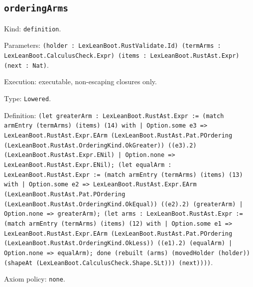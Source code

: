 \documentclass[11pt]{article}
\begin{document}
\subsection*{\texttt{orderingArms}}
\noindent Kind: \texttt{definition}.\par
\noindent Parameters: \texttt{(holder : LexLeanBoot.RustValidate.Id) (termArms : LexLeanBoot.CalculusCheck.Expr) (items : LexLeanBoot.RustAst.Expr) (next : Nat)}.\par
\noindent Execution: executable, non-escaping closures only.\par
\noindent Type: \texttt{Lowered}.\par
\noindent Definition: \texttt{(let greaterArm : LexLeanBoot.RustAst.Expr := (match armEntry (termArms) (items) (14) with | Option.some e3 => LexLeanBoot.RustAst.Expr.EArm (LexLeanBoot.RustAst.Pat.POrdering (LexLeanBoot.RustAst.OrderingKind.OkGreater)) ((e3).2) (LexLeanBoot.RustAst.Expr.ENil) | Option.none => LexLeanBoot.RustAst.Expr.ENil); (let equalArm : LexLeanBoot.RustAst.Expr := (match armEntry (termArms) (items) (13) with | Option.some e2 => LexLeanBoot.RustAst.Expr.EArm (LexLeanBoot.RustAst.Pat.POrdering (LexLeanBoot.RustAst.OrderingKind.OkEqual)) ((e2).2) (greaterArm) | Option.none => greaterArm); (let arms : LexLeanBoot.RustAst.Expr := (match armEntry (termArms) (items) (12) with | Option.some e1 => LexLeanBoot.RustAst.Expr.EArm (LexLeanBoot.RustAst.Pat.POrdering (LexLeanBoot.RustAst.OrderingKind.OkLess)) ((e1).2) (equalArm) | Option.none => equalArm); done (rebuilt (arms) (movedHolder (holder)) (shapeAt (LexLeanBoot.CalculusCheck.Shape.SLt))) (next))))}.\par
\noindent Axiom policy: \texttt{none}.\par
\end{document}
